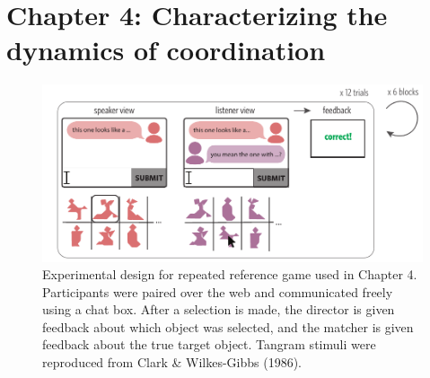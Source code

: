 \documentclass[11pt]{article}
\begin{document}
\section*{Chapter 4: Characterizing the dynamics of coordination} 

\begin{figure}[b!]
\centering
\includegraphics[scale=.93]{chapter4}
\caption{\small Experimental design for repeated reference game used in Chapter 4.  Participants were paired over the web and communicated freely using a chat box. After a selection is made, the director is given feedback about which object was selected, and the matcher is given feedback about the true target object. Tangram stimuli were reproduced from Clark \& Wilkes-Gibbs (1986).}
\label{fig:chapter4}
\end{figure}

\end{document}
